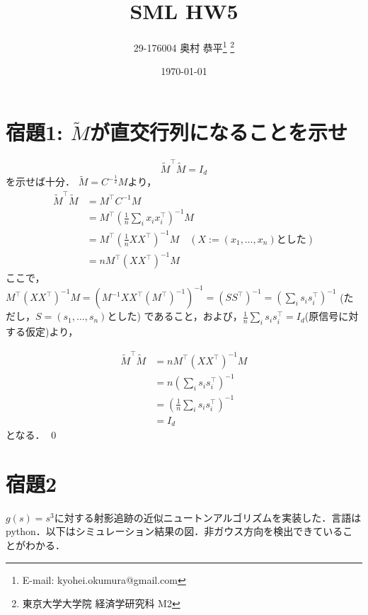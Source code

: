 \documentclass[11pt,a4paper,dvipdfmx]{article}
\theoremstyle{plain}
\renewcommand{\tilde}{\widetilde}
\newcommand{\1}{\mbox{1}\hspace{-0.25em}\mbox{l}}
\begin{document}
\title{SML HW5}
\author{29-176004 奥村 恭平{\footnote{E-mail: kyohei.okumura@gmail.com}
\footnote{東京大学大学院 経済学研究科 M2}
}}
\date{\today}
\maketitle


\section*{宿題1: $\tilde{M}$が直交行列になることを示せ}
$$
\tilde{M}^\top \tilde{M} = I_d
$$
を示せば十分．
$\tilde{M} = C^{-\frac{1}{2}}M$より，
\begin{align*}
	\tilde{M}^\top \tilde{M} &= M^\top C^{-1} M \\
	&= M^\top \left( \frac{1}{n} \sum_i x_i x_i^\top \right)^{-1} M \\
	&= M^\top \left( \frac{1}{n} X X^\top \right)^{-1} M \quad (X := (x_1, \dots, x_n) \text{とした}) \\
	&= n M^\top \left(  X X^\top \right)^{-1} M
\end{align*}
ここで，
$
M^\top \left(  X X^\top \right)^{-1} M
= (M^{-1} X X^\top (M^\top)^{-1})^{-1} = (S S^\top)^{-1} = (\sum_i s_i s_i^\top)^{-1}
$
(ただし，$S = (s_1, \dots, s_n)$とした) であること，および，$\frac{1}{n}\sum_i s_i s_i^\top = I_d$(原信号に対する仮定)より，

\begin{align*}
	\tilde{M}^\top \tilde{M}
	&= n M^\top \left(  X X^\top \right)^{-1} M \\
	&= n \left( \sum_i s_i s_i^\top \right)^{-1} \\
	&= \left( \frac{1}{n} \sum_i s_i s_i^\top \right)^{-1} \\
	&= I_d
\end{align*}
となる．
\qed

\newpage
\section*{宿題2}
$g(s) = s^3$に対する射影追跡の近似ニュートンアルゴリズムを実装した．言語はpython．以下はシミュレーション結果の図．非ガウス方向を検出できていることがわかる．
\end{document}
